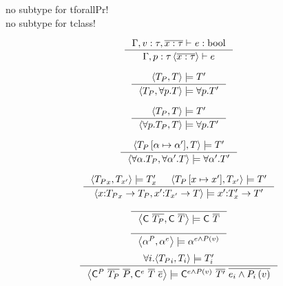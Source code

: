 \documentclass[10pt,a4paper]{article}
\newcommand\highlight[2]{{\setlength\fboxsep{1pt}\colorbox{#1}{#2}}}
\def\NV{\highlight{colorNV}}
\begin{document}
\NV{no subtype for tforallPr!} \\
\NV{no subtype for tclass!}

\hfill{}

$$
\inference{
	\hasType{\Gamma, v:\tau, \overline{x:\tau}}{}{e}{\tbool}
}{
	\isWellFormedP{\Gamma}{\pdVar{p}{\tau}{\overline{x:\tau}}}{e}
}[]
$$

\hfill\fbox{\unifyTypes{\pdTy}{\dTy}{\dTy}}

$$
\inference{
	\unifyTypes{\pdTy}{\dTy}{\dTy'}
}{
	\unifyTypes{\pdTy}{\tforallPr{p}{\dTy}}{\tforallPr{p}{\dTy'}}
}[]
$$


$$
\inference{
	\unifyTypes{\pdTy}{\dTy}{\dTy'}
}{
	\unifyTypes{\tforallPr{p}{\pdTy}}{\dTy}{\tforallPr{p}{\dTy'}}
}[]
$$

$$
\inference{
	\unifyTypes{{\pdTy \subT{\alpha}{\alpha'}}}{{\dTy}}{\dTy'}
}{
	\unifyTypes	{\tforallTy{\alpha}{\pdTy}}
				{\tforallTy{\alpha'}{\dTy}}
				{\tforallTy{\alpha'}{\dTy'}}
}[]
$$

$$
\inference{
	\unifyTypes	{\pdTy_x}{\dTy_{x'}}{\dTy_x'} &
	\unifyTypes	{\pdTy \sub{x}{x'}}{\dTy_{x'}}{\dTy'}
}{
	\unifyTypes	{\tfun{x}{{\pdTy_x}}{\pdTy}}
				{\tfun{x'}{\dTy_{x'}}{\dTy}}
				{\tfun{x'}{\dTy_x'}{\dTy'}}
}[]
$$

$$
\inference{
}{
	\unifyTypes	{\tclass{\nhaskell{C}}{\listOf{\pdTy}}}
				{\tclass{\nhaskell{C}}{\listOf{\dTy}}}
				{\tclass{\nhaskell{C}}{\listOf{\dTy}}}
}[]
$$
$$
\inference{
}{
	\unifyTypes	{\tvar{\alpha}{P}} 
				{\tvar{\alpha}{e}}
				{\tvar{\alpha}{e \land \pdapp{P}{v}}}
}[]
$$
$$
\inference{
	\forall i . {\unifyTypes{\pdTy_i}{\dTy_i}{\dTy_i'}}
}{
	\unifyTypes	{\tcon{\nhaskell{C}}{P}{\listOf{\pdTy}}{\listOf{P}}}
				{\tcon{\nhaskell{C}}{e}{\listOf{\dTy}}{\listOf{e}}}
				{\tcon	{\nhaskell{C}}
						{e \land \pdapp{P}{v}}{\listOf{\dTy'}}
						{\listOf{e_i \land \pdapp{P_i}{v}}}
				}
}[]
$$

\hfill{}
\end{document}
